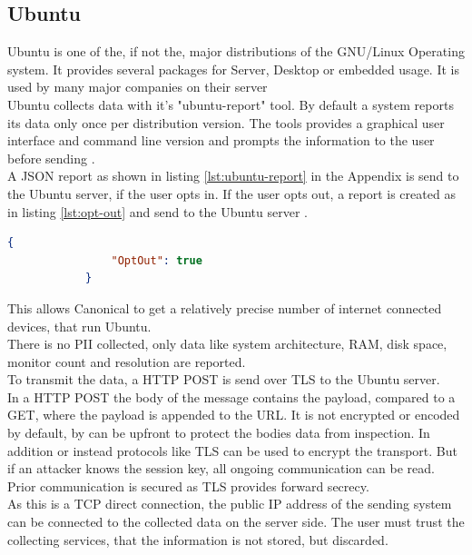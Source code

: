     \subsection{Ubuntu}
        Ubuntu is one of the, if not the, major distributions of the GNU/Linux Operating system. It provides several packages for Server, Desktop or embedded usage. It is used by many major companies on their server \cite{canonical_enterprise_nodate}\\
        Ubuntu collects data with it's "ubuntu-report" tool. By default a system reports its data only once per distribution version. The tools provides a graphical user interface and command line version and prompts the information to the user before sending \cite{roche_ubuntuubuntu-report_2020}.\\
        A JSON report as shown in listing \ref{lst:ubuntu-report} in the Appendix is send to the Ubuntu server, if the user opts in. If the user opts out, a report is created as in listing \ref{lst:opt-out} and send to the Ubuntu server \cite{roche_ubuntuubuntu-report_2020}.\\ 
        \begin{lstlisting}[language=json, caption=JSON report on opt out, label=lst:opt-out]
            {
                "OptOut": true
            }
        \end{lstlisting}
        This allows Canonical to get a relatively precise number of internet connected devices, that run Ubuntu.\\
        There is no PII collected, only data like system architecture, RAM, disk space, monitor count and resolution are reported.\\
        To transmit the data, a HTTP POST is send over TLS to the Ubuntu server.\\
        
        In a HTTP POST the body of the message contains the payload, compared to a GET, where the payload is appended to the URL.
        It is not encrypted or encoded by default, by can be upfront to protect the bodies data from inspection. In addition or instead protocols like TLS can be used to encrypt the transport. But if an attacker knows the session key, all ongoing communication can be read. Prior communication is secured as TLS provides forward secrecy.\\
        
        As this is a TCP direct connection, the public IP address of the sending system can be connected to the collected data on the server side.
        The user must trust the collecting services, that the information is not stored, but discarded.\\
        
